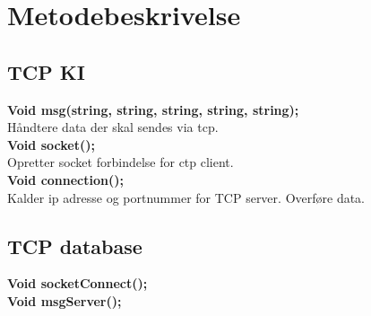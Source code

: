 \chapter{Metodebeskrivelse}
\section{TCP KI}
\textbf{Void msg(string, string, string, string, string);}\\
Håndtere data der skal sendes via tcp.\\
\textbf{Void socket();}\\
Opretter socket forbindelse for ctp client.\\
\textbf{Void connection();}\\
Kalder ip adresse og portnummer for TCP server. Overføre data.\\


\section{TCP database}
\textbf{Void socketConnect();}\\
\textbf{Void msgServer();}\\